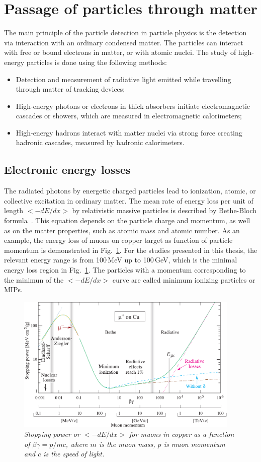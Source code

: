 \section{Passage of particles through matter}
\label{sec:passage}
The main principle of the particle detection in particle physics is the detection via interaction with an ordinary condensed matter. 
The particles can interact with free or bound electrons in matter, or with atomic nuclei. 
The study of high-energy particles is done using the following methods:
\begin{itemize}
	\item Detection and measurement of radiative light emitted while travelling through matter of tracking devices;
	\item High-energy photons or electrons in thick absorbers initiate electromagnetic cascades or showers, which are measured in electromagnetic calorimeters;
	\item High-energy hadrons interact with matter nuclei via strong force creating  hadronic cascades, measured by hadronic calorimeters.
\end{itemize}
\subsection{Electronic energy losses}
The radiated photons by energetic charged particles lead to ionization, atomic, or collective excitation in ordinary matter. 
The mean rate of energy loss per unit of length $<-dE/dx>$ by relativistic massive particles is described by Bethe-Bloch formula~\cite{bib:PDG}. 
This equation depends on the particle charge and momentum, as well as on the matter properties, such as atomic mass and atomic number. 
As an example, the energy loss of muons on copper target as function of particle momentum is demonstrated in Fig.~\ref{fig:BB_2}.
For the studies presented in this thesis, the relevant energy range is from 100\,MeV up to 100\,GeV, which is the minimal energy loss region in Fig.~\ref{fig:BB_2}.
The particles with a momentum corresponding to the minimun of the  $<-dE/dx>$ curve are called minimum ionizing particles or MIPs. 
\begin{figure}
	\centering
	\includegraphics[width=0.95\textwidth]{ECAL/graphics/rpp_icru49_cu.pdf}
	\caption{\label{fig:BB_2} \sl Stopping power or $<-dE/dx>$  for muons in copper as a function of $\beta\gamma = p/mc$, where $m$ is the muon mass, $p$ is muon momentum and $c$ is the speed of light. }
\end{figure}
